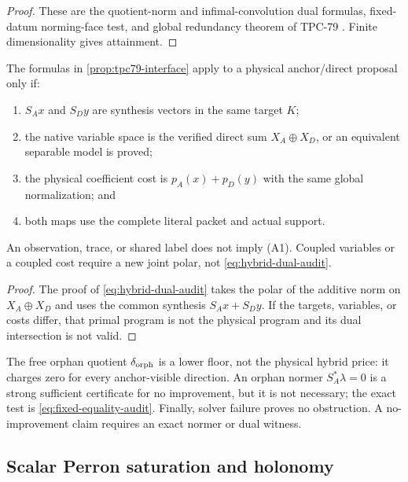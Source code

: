 \begin{proof}
These are the quotient-norm and infimal-convolution dual formulas,
fixed-datum norming-face test, and global redundancy theorem of
TPC-79 \citep{WangTPC79}.  Finite dimensionality gives attainment.
\end{proof}

\begin{proposition}
\label{prop:tpc79-admissibility}
The formulas in \cref{prop:tpc79-interface} apply to a physical
anchor/direct proposal only if:
\begin{enumerate}[label=(A\arabic*),leftmargin=2.7em]
\item \(S_Ax\) and \(S_Dy\) are synthesis vectors in the same target
\(K\);
\item the native variable space is the verified direct sum
\(X_A\oplus X_D\), or an equivalent separable model is proved;
\item the physical coefficient cost is
\(p_A(x)+p_D(y)\) with the same global normalization; and
\item both maps use the complete literal packet and actual support.
\end{enumerate}
An observation, trace, or shared label does not imply (A1).
Coupled variables or a coupled cost require a new joint polar, not
\eqref{eq:hybrid-dual-audit}.
\end{proposition}

\begin{proof}
The proof of \eqref{eq:hybrid-dual-audit} takes the polar of the
additive norm on \(X_A\oplus X_D\) and uses the common synthesis
\(S_Ax+S_Dy\).  If the targets, variables, or costs differ, that
primal program is not the physical program and its dual intersection
is not valid.
\end{proof}

The free orphan quotient \(\delta_{\rm orph}\) is a lower floor, not
the physical hybrid price: it charges zero for every anchor-visible
direction.  An orphan normer \(S_A^*\lambda=0\) is a strong sufficient
certificate for no improvement, but it is not necessary; the exact
test is \eqref{eq:fixed-equality-audit}.  Finally, solver failure
proves no obstruction.  A no-improvement claim requires an exact
normer or dual witness.

\subsection{Scalar Perron saturation and holonomy}

